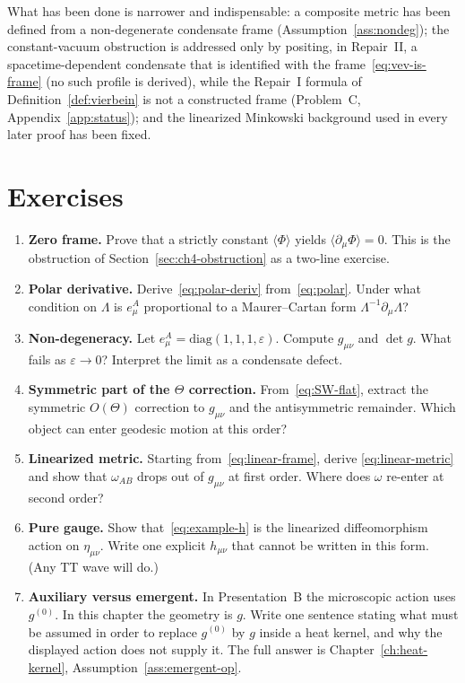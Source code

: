 What has been done is narrower and indispensable: a composite metric
has been defined from a non-degenerate condensate frame
(Assumption~\ref{ass:nondeg}); the constant-vacuum obstruction
is addressed only by positing, in Repair~II, a spacetime-dependent
condensate that is identified with the frame~\eqref{eq:vev-is-frame}
(no such profile is derived), while the Repair~I formula of
Definition~\ref{def:vierbein} is not a constructed frame
(Problem~C, Appendix~\ref{app:status}); and the linearized
Minkowski background used in every later proof has been fixed.

\section{Exercises}
\label{sec:ch4-exercises}

\begin{enumerate}
  \item \textbf{Zero frame.}
    Prove that a strictly constant \(\langle\Phi\rangle\) yields
    \(\langle\partial_\mu\Phi\rangle=0\). This is the obstruction of
    Section~\ref{sec:ch4-obstruction} as a two-line exercise.
  \item \textbf{Polar derivative.}
    Derive~\eqref{eq:polar-deriv} from~\eqref{eq:polar}. Under what
    condition on \(\Lambda\) is \(e^A_\mu\) proportional to a
    Maurer--Cartan form \(\Lambda^{-1}\partial_\mu\Lambda\)?
  \item \textbf{Non-degeneracy.}
    Let \(e^A_\mu=\mathrm{diag}(1,1,1,\varepsilon)\). Compute
    \(g_{\mu\nu}\) and \(\det g\). What fails as
    \(\varepsilon\to 0\)? Interpret the limit as a condensate defect.
  \item \textbf{Symmetric part of the \(\Theta\) correction.}
    From~\eqref{eq:SW-flat}, extract the symmetric \(O(\Theta)\)
    correction to \(g_{\mu\nu}\) and the antisymmetric remainder.
    Which object can enter geodesic motion at this order?
  \item \textbf{Linearized metric.}
    Starting from~\eqref{eq:linear-frame}, derive
    \eqref{eq:linear-metric} and show that \(\omega_{AB}\) drops out
    of \(g_{\mu\nu}\) at first order. Where does \(\omega\) re-enter
    at second order?
  \item \textbf{Pure gauge.}
    Show that~\eqref{eq:example-h} is the linearized diffeomorphism
    action on \(\eta_{\mu\nu}\). Write one explicit \(h_{\mu\nu}\)
    that cannot be written in this form. (Any TT wave will do.)
  \item \textbf{Auxiliary versus emergent.}
    In Presentation~B the microscopic action uses \(g^{(0)}\). In
    this chapter the geometry is \(g\). Write one sentence stating what must be assumed in order to
replace \(g^{(0)}\) by \(g\) inside a heat kernel, and why the
displayed action does not supply it. The full answer is
Chapter~\ref{ch:heat-kernel}, Assumption~\ref{ass:emergent-op}.
\end{enumerate}

